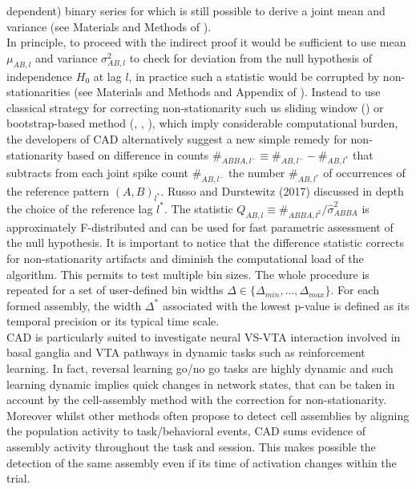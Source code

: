\begin{framed}
dependent) binary series for which is still possible to derive a joint mean and variance (see Materials and Methods of \cite{RussoDurstewitz}).\\In principle, to proceed with the indirect proof it would be sufficient to use mean $\mu_{AB,l}$ and variance $\sigma^{2}_{AB,l}$ to check for deviation from the null hypothesis of independence $H_0$ at lag $l$, in practice such a statistic would be corrupted by non-stationarities (see Materials and Methods and Appendix of \cite{RussoDurstewitz}). Instead to use classical strategy for correcting non-stationarity such us sliding window (\cite{Gruen}) or bootstrap-based method (\cite{Fujisawa}, \cite{Pipa}, \cite{Picado}), which imply considerable computational burden, the developers of CAD alternatively suggest a new simple remedy for non-stationarity based on difference in counts $\#_{ABBA,l^-} \equiv \#_{AB,l^-} - \#_{AB,l^*}$ that subtracts from each joint spike count $\#_ {AB,l^-}$ the number $\#_{AB,l^*}$ of occurrences of the reference pattern $(A,B)_{l^*}$. Russo and Durstewitz (2017) discussed in depth the choice of the reference lag $l^*$. The statistic $Q_{AB,l}\equiv\#_{ABBA,l^2}/\hat{\sigma}_{ABBA}^2$ is approximately F-distributed and can be used for fast parametric assessment of the null hypothesis. It is important to notice that the difference statistic corrects for non-stationarity artifacts and diminish the computational load of the algorithm. This permits to test multiple bin sizes. The whole procedure is repeated for a set of user-defined bin widths $\Delta \in \{\Delta_{min},...,\Delta_{max}\}$. For each formed assembly, the width $\Delta^*$ associated with the lowest p-value is defined as its temporal precision or its typical time scale.\\CAD is particularly suited to investigate neural VS-VTA interaction involved in basal ganglia and VTA pathways in dynamic tasks such as reinforcement learning. In fact, reversal learning go/no go tasks are highly dynamic and such learning dynamic implies quick changes in network states, that can be taken in account by the cell-assembly method with the correction for non-stationarity. Moreover whilst other methods often propose to detect cell assemblies by aligning the population activity to task/behavioral events, CAD sums evidence of assembly activity throughout the task and session. This makes possible the detection of the same assembly even if its time of activation changes within the trial.
\end{framed}
